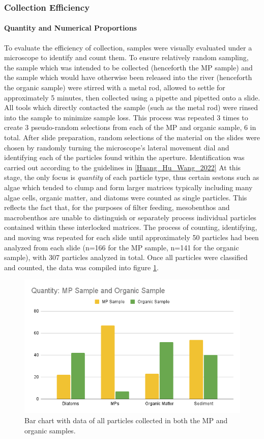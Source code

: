 \documentclass[fleqn,10pt]{SelfArx} %
\begin{document}
	\subsubsection{Collection Efficiency}
	\paragraph{Quantity and Numerical Proportions}
	To evaluate the efficiency of collection, samples were visually evaluated under a microscope to identify and count them. To ensure relatively random sampling, the sample which was intended to be collected (henceforth the MP sample) and the sample which would have otherwise been released into the river (henceforth the organic sample) were stirred with a metal rod, allowed to settle for approximately 5 minutes, then collected using a pipette and pipetted onto a slide. All tools which directly contacted the sample (such as the metal rod) were rinsed into the sample to minimize sample loss. This process was repeated 3 times to create 3 pseudo-random selections from each of the MP and organic sample, 6 in total. After slide preparation, random selections of the material on the slides were chosen by randomly turning the microscope's lateral movement dial and identifying each of the particles found within the aperture. Identification was carried out according to the guidelines in \ref{Huang_Hu_Wang_2022} At this stage, the only focus is \emph{quantity} of each particle type, thus certain sestons such as algae which tended to clump and form larger matrices typically including many algae cells, organic matter, and diatoms were counted as single particles. This reflects the fact that, for the purposes of filter feeding, mesobenthos and macrobenthos are unable to distinguish or separately process individual particles contained within these interlocked matrices. The process of counting, identifying, and moving was repeated for each slide until approximately 50 particles had been analyzed from each slide (n=166 for the MP sample, n=141 for the organic sample), with 307 particles analyzed in total. Once all particles were classified and counted, the data was compiled into figure \ref{fig:mpcounting}.
	\begin{figure}[h]
		\centering
		\includegraphics[width=1\linewidth]{Figures/MPOrganicCounting}
		\caption[Collected Particle Classification]{Bar chart with data of all particles collected in both the MP and organic samples.}
		\label{fig:mpcounting}
	\end{figure}
	
\end{document}
